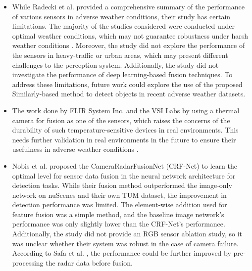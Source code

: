 \documentclass[rnd]{mas_proposal}
\begin{document}
\begin{itemize}

    
      \item While Radecki et al. \cite{radecki2016all} provided a comprehensive summary of the performance of various sensors in adverse weather conditions, their study has certain limitations. The majority of the studies considered were conducted under optimal weather conditions, which may not guarantee robustness under harsh weather conditions \cite{emzivat2018formal}. Moreover, the study did not explore the performance of the sensors in heavy-traffic or urban areas, which may present different challenges to the perception system. Additionally, the study did not investigate the performance of deep learning-based fusion techniques. To address these limitations, future work could explore the use of the proposed Similarly-based method to detect objects in recent adverse weather datasets.

      \item The work done by FLIR System Inc. \cite{fused_aeb} and the VSI Labs \cite{VSILabs} by using a thermal camera for fusion as one of the sensors, which raises the concerns of the durability of such temperature-sensitive devices in real environments. This needs further validation in real environments in the future to ensure their usefulness in adverse weather conditions \cite{zang2019impact}.
      \item Nobis et al. \cite{nobis2019deep} proposed the CameraRadarFusionNet (CRF-Net) to learn the optimal level for sensor data fusion in the neural network architecture for detection tasks. While their fusion method outperformed the image-only network on nuScenes \cite{caesar2020nuscenes} and their own TUM dataset, the improvement in detection performance was limited. The element-wise addition used for feature fusion was a simple method, and the baseline image network's performance was only slightly lower than the CRF-Net's performance. Additionally, the study did not provide an RGB sensor ablation study, so it was unclear whether their system was robust in the case of camera failure. According to Safa et al. \cite{safa2021fail}, the performance could be further improved by pre-processing the radar data before fusion.
      

\end{itemize}
\end{document}
